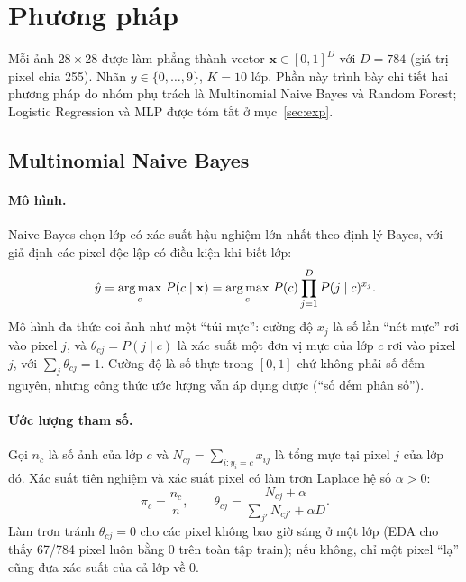 \section{Phương pháp}

Mỗi ảnh $28\times28$ được làm phẳng thành vector $\mathbf{x}\in[0,1]^{D}$ với $D=784$ (giá trị pixel chia 255). Nhãn $y\in\{0,\dots,9\}$, $K=10$ lớp. Phần này trình bày chi tiết hai phương pháp do nhóm phụ trách là Multinomial Naive Bayes và Random Forest; Logistic Regression và MLP được tóm tắt ở mục~\ref{sec:exp}.

\subsection{Multinomial Naive Bayes}
 
\paragraph{Mô hình.} Naive Bayes chọn lớp có xác suất hậu nghiệm lớn nhất theo định lý Bayes, với giả định các pixel độc lập có điều kiện khi biết lớp:
\begin{equation}
\hat y=\operatorname*{arg\,max}_{c}\,P(c\mid\mathbf{x})=\operatorname*{arg\,max}_{c}\,P(c)\prod_{j=1}^{D}P(j\mid c)^{x_j}.
\end{equation}
Mô hình đa thức coi ảnh như một ``túi mực'': cường độ $x_j$ là số lần ``nét mực'' rơi vào pixel $j$, và $\theta_{cj}=P(j\mid c)$ là xác suất một đơn vị mực của lớp $c$ rơi vào pixel $j$, với $\sum_j\theta_{cj}=1$. Cường độ là số thực trong $[0,1]$ chứ không phải số đếm nguyên, nhưng công thức ước lượng vẫn áp dụng được (``số đếm phân số'').
 
\paragraph{Ước lượng tham số.} Gọi $n_c$ là số ảnh của lớp $c$ và $N_{cj}=\sum_{i:y_i=c}x_{ij}$ là tổng mực tại pixel $j$ của lớp đó. Xác suất tiên nghiệm và xác suất pixel có làm trơn Laplace hệ số $\alpha>0$:
\begin{equation}
\pi_c=\frac{n_c}{n},\qquad
\theta_{cj}=\frac{N_{cj}+\alpha}{\sum_{j'}N_{cj'}+\alpha D}.
\end{equation}
Làm trơn tránh $\theta_{cj}=0$ cho các pixel không bao giờ sáng ở một lớp (EDA cho thấy 67/784 pixel luôn bằng 0 trên toàn tập train); nếu không, chỉ một pixel ``lạ'' cũng đưa xác suất của cả lớp về 0.
 
